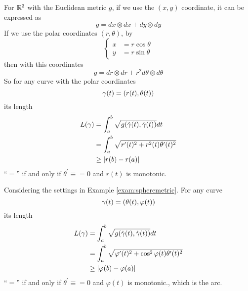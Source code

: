 \begin{exam}\label{exam:shortestinr2}
	For $\mathbb{R}^2$ with the Euclidean metric $g$, if we use the $(x,y)$ coordinate, it can be expressed as
	\begin{equation*}
		g = dx\otimes dx + dy\otimes dy
	\end{equation*}
	If we use the polar coordinates $(r,\theta)$, by
	\begin{equation*}
		\left\{
			\begin{aligned}
				x &= r\cos\theta \\
				y &= r\sin \theta
			\end{aligned}
		\right.
	\end{equation*}
	then with this coordinates
	\begin{equation*}
		g = dr \otimes dr + r^2d\theta \otimes d\theta
	\end{equation*}
	So for any curve with the polar coordinates
	\begin{equation*}
		\gamma(t) = \left(r(t),\theta(t)\right)
	\end{equation*}
	its length
	\begin{equation*}
		\begin{aligned}
			L(\gamma) &= \int_a^b \sqrt{g(\dot{\gamma}(t),\dot{\gamma}(t))}dt \\
			&= \int_a^b \sqrt{r^\prime(t)^2 + r^2(t)\theta^\prime(t)^2} \\
			&\geq \left\lvert r(b) - r(a)\right\lvert
		\end{aligned}
	\end{equation*}
	``$=$'' if and only if $\theta^\prime \equiv = 0$ and $r(t)$ is monotonic.

\end{exam}
\begin{exam}\label{exam:sphereshortest}
	Considering the settings in Example \ref{exam:spheremetric}. For any curve
	\begin{equation*}
		\gamma(t) = \left(\theta(t),\varphi(t)\right)
	\end{equation*}
	its length 
	\begin{equation*}
		\begin{aligned}
			L(\gamma) &= \int_a^b \sqrt{g(\dot{\gamma}(t),\dot{\gamma}(t))}dt \\
			&= \int_a^b \sqrt{\varphi^\prime(t)^2 + \cos^2\varphi(t)\theta^\prime(t)^2} \\
			&\geq \left\lvert\varphi(b) - \varphi(a)\right\lvert
		\end{aligned}
	\end{equation*}
	``$=$'' if and only if $\theta^\prime \equiv = 0$ and $\varphi(t)$ is monotonic., which is the arc.
\end{exam}
